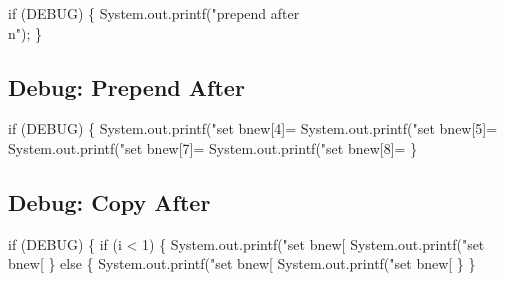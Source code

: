 \nwenddocs{}\endmoddef\nwstartdeflinemarkup{}\nwenddeflinemarkup
if (DEBUG) \{
  System.out.printf("prepend after\\n");
\}
\nwendcode{}\nwdocspar

\subsection{Debug: Prepend After}

\nwenddocs{}\endmoddef\nwstartdeflinemarkup{}\nwenddeflinemarkup
if (DEBUG) \{
  System.out.printf("set bnew[4]=%
  System.out.printf("set bnew[5]=%
  System.out.printf("set bnew[7]=%
  System.out.printf("set bnew[8]=%
\}
\nwendcode{}\nwdocspar

\subsection{Debug: Copy After}

\nwenddocs{}\endmoddef\nwstartdeflinemarkup{}\nwenddeflinemarkup
if (DEBUG) \{
  if (i < 1) \{
    System.out.printf("set bnew[%
    System.out.printf("set bnew[%
  \} else \{
    System.out.printf("set bnew[%
    System.out.printf("set bnew[%
  \}
\}
\nwendcode{}\nwdocspar

